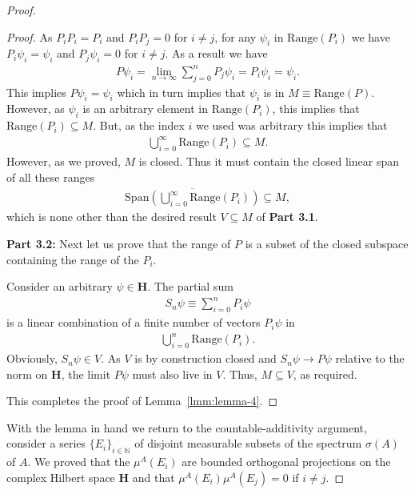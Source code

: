 \begin{proof}
\begin{proof}
As $P_iP_i = P_i$ and $P_iP_j = 0$ for $i \neq j$, for any $\psi_i$ in $\text{Range}(P_i)$ we have $P_i\psi_i = \psi_i$ and $P_j\psi_i = 0$ for $i \neq j$. As a result we have
\begin{align}
    P\psi_i = \lim\limits_{n \rightarrow \infty} \sum_{j = 0}^n P_j\psi_i = P_i\psi_i = \psi_i.
\end{align}
This implies $P\psi_i = \psi_i$ which in turn implies that $\psi_i$ is in $M \equiv \text{Range}(P)$. However, as $\psi_i$ is an arbitrary element in $\text{Range}(P_i)$, this implies that $\text{Range}(P_i) \subseteq M$. But, as the index $i$ we used was arbitrary this implies that
\begin{align}
    \bigcup_{i = 0}^\infty \text{Range}(P_i) \subseteq M.
\end{align}
However, as we proved, $M$ is closed. Thus it must contain the closed linear span of all these ranges
\begin{align}
    \overline{\text{Span} \left( \bigcup_{i = 0}^\infty \text{Range}(P_i) \right)} \subseteq M,
\end{align}
which is none other than the desired result $V \subseteq M$ of \textbf{Part 3.1}.

\textbf{Part 3.2:} Next let us prove that the range of $P$ is a subset of the closed subspace containing the range of the $P_i$.

Consider an arbitrary $\psi \in \mathbf{H}$. The partial sum
\begin{align}
    S_n\psi \equiv \sum_{i = 0}^n P_i\psi
\end{align}
is a linear combination of a finite number of vectors $P_i\psi$ in
\begin{align}
    \bigcup_{i = 0}^n \text{Range}(P_i).
\end{align}
Obviously, $S_n\psi \in V$. As $V$ is by construction closed and $S_n\psi \rightarrow P\psi$ relative to the norm on $\mathbf{H}$, the limit $P\psi$ must also live in $V$. Thus, $M \subseteq V$, as required.

This completes the proof of Lemma~\ref{lmm:lemma-4}.
\end{proof}

With the lemma in hand we return to the countable-additivity argument, consider a series $\{ E_i \}_{i \in \mathbb{N}}$ of disjoint measurable subsets of the spectrum $\sigma(A)$ of $A$. We proved that the $\mu^A(E_i)$ are bounded orthogonal projections on the complex Hilbert space $\mathbf{H}$ and that $\mu^A(E_i)\mu^A(E_j) = 0$ if $i \neq j$.


\end{proof}
